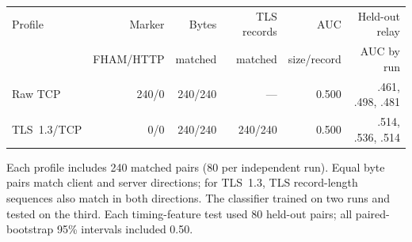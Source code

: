 \begin{tabular}{lrrrrr}
\toprule
Profile & Marker & Bytes & TLS records & AUC & Held-out relay \\
 & FHAM/HTTP & matched & matched & size/record & AUC by run \\
\midrule
Raw TCP & 240/0 & 240/240 & --- & 0.500 & .461, .498, .481 \\
TLS~1.3/TCP & 0/0 & 240/240 & 240/240 & 0.500 & .514, .536, .514 \\
\bottomrule
\end{tabular}

\vspace{2pt}
\parbox{\linewidth}{\footnotesize Each profile includes 240 matched pairs
(80 per independent run). Equal byte pairs match client and server directions;
for TLS~1.3, TLS record-length sequences also match in both directions. The
classifier trained on two runs and tested on the third. Each timing-feature
test used 80 held-out pairs; all paired-bootstrap 95\% intervals included
0.50.}
